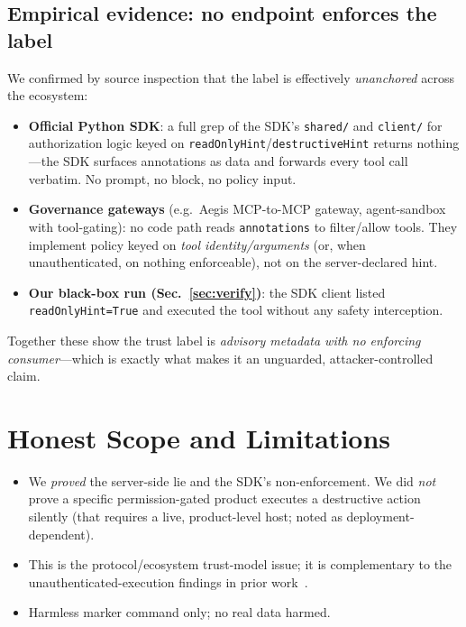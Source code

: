 \documentclass{llncs}
\begin{document}
\subsection{Empirical evidence: no endpoint enforces the label}\label{sub:empirical}
We confirmed by source inspection that the label is effectively \emph{unanchored} across the ecosystem:
\begin{itemize}
    \item \textbf{Official Python SDK}: a full grep of the SDK's \texttt{shared/} and \texttt{client/} for authorization logic keyed on \texttt{readOnlyHint}/\texttt{destructiveHint} returns nothing---the SDK surfaces annotations as data and forwards every tool call verbatim. No prompt, no block, no policy input.
    \item \textbf{Governance gateways} (e.g.\ Aegis MCP-to-MCP gateway, agent-sandbox with tool-gating): no code path reads \texttt{annotations} to filter/allow tools. They implement policy keyed on \emph{tool identity/arguments} (or, when unauthenticated, on nothing enforceable), not on the server-declared hint.
    \item \textbf{Our black-box run (Sec.~\ref{sec:verify})}: the SDK client listed \texttt{readOnlyHint=True} and executed the tool without any safety interception.
\end{itemize}
Together these show the trust label is \emph{advisory metadata with no enforcing consumer}---which is exactly what makes it an unguarded, attacker-controlled claim.

\section{Honest Scope and Limitations}\label{sec:scope}
\begin{itemize}
    \item We \emph{proved} the server-side lie and the SDK's non-enforcement. We did \emph{not} prove a specific permission-gated product executes a destructive action silently (that requires a live, product-level host; noted as deployment-dependent).
    \item This is the protocol/ecosystem trust-model issue; it is complementary to the unauthenticated-execution findings in prior work~\cite{anon2026mcp}.
    \item Harmless marker command only; no real data harmed.
\end{itemize}
\end{document}
